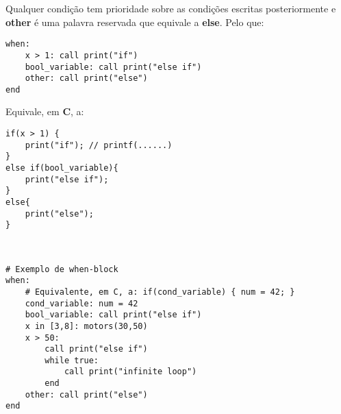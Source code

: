 \documentclass{report}
\begin{document}
Qualquer condição tem prioridade sobre as condições escritas posteriormente e \textbf{other} é uma palavra reservada que equivale a \textbf{else}. Pelo que:

\begin{verbatim}
when:
    x > 1: call print("if")
    bool_variable: call print("else if")
    other: call print("else")
end
\end{verbatim}

Equivale, em \textbf{C}, a:\\

\begin{verbatim}
if(x > 1) {
    print("if"); // printf(......)
}
else if(bool_variable){
    print("else if");
}
else{
    print("else");
}
\end{verbatim}\\

\vspace{7mm}

\begin{verbatim}
# Exemplo de when-block
when:
    # Equivalente, em C, a: if(cond_variable) { num = 42; }
    cond_variable: num = 42
    bool_variable: call print("else if")
    x in [3,8]: motors(30,50)
    x > 50: 
        call print("else if")
        while true:
            call print("infinite loop")
        end
    other: call print("else")
end
\end{verbatim}\\
\vspace{5mm}
\end{document}
